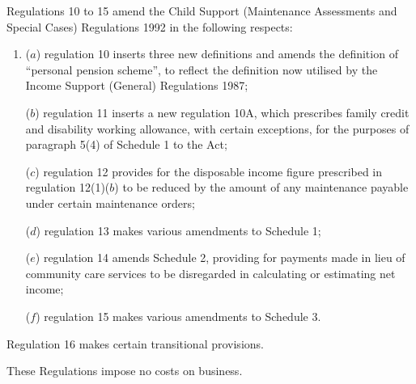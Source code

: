 \documentclass[a4paper]{article}
\begin{document}
 Regulations 10 to 15 amend the Child Support (Maintenance Assessments and Special Cases) Regulations 1992 in the following respects:
\begin{enumerate}\item[]
 ($a$) regulation 10 inserts three new definitions and amends the definition of “personal pension scheme”, to reflect the definition now utilised by the Income Support (General) Regulations 1987;

 ($b$) regulation 11 inserts a new regulation 10A, which prescribes family credit and disability working allowance, with certain exceptions, for the purposes of paragraph 5(4) of Schedule 1 to the Act;

 ($c$) regulation 12 provides for the disposable income figure prescribed in regulation 12(1)($b$) to be reduced by the amount of any maintenance payable under certain maintenance orders;

 ($d$) regulation 13 makes various amendments to Schedule 1;

 ($e$) regulation 14 amends Schedule 2, providing for payments made in lieu of community care services to be disregarded in calculating or estimating net income;

 ($f$) regulation 15 makes various amendments to Schedule 3.
\end{enumerate}

  Regulation 16 makes certain transitional provisions.

  These Regulations impose no costs on business.
\end{document}
